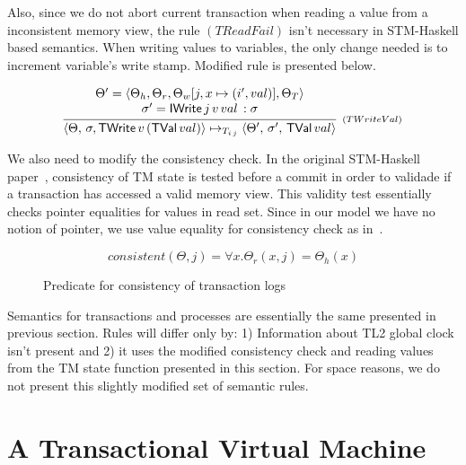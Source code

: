 \documentclass[sigplan, anonymous, review]{acmart}
\theoremstyle{definition}
\newcommand{\C}[1]{\red{\mathsf{#1}}}
\begin{document}
Also, since we do not abort current transaction when reading a value from a inconsistent
memory view, the rule $(TReadFail)$ isn't necessary in STM-Haskell based semantics. When writing
values to variables, the only change needed is to increment variable's write stamp.
Modified rule is presented below.

\[
  \begin{array}{l}
  \infer[_{(TWriteVal)}]
        { \langle \Theta, \, \sigma, \ensuremath{\C{TWrite}}\,v\,(\ensuremath{\C{TVal}}\,val)\rangle \mapsto_{T_{i\,j}}
          \langle \Theta', \, \sigma',\,\ensuremath{\C{TVal}}\,val\rangle}
        {\begin{array}{c}
            \Theta' = \langle \Theta_h, \Theta_r, \Theta_w[j,x \mapsto (i',val)], \Theta_T\rangle \\
            \sigma' = \ensuremath{\C{IWrite}}\,j\,v\,val\, : \sigma \\
         \end{array}}
  \end{array}
\]


We also need to modify the consistency check. In the original STM-Haskell paper~\cite{Harris05}, consistency
of TM state is tested before a commit in order to validade if a transaction has accessed a valid memory view.
This validity test essentially checks pointer equalities for values in read set. Since in our model we have no
notion of pointer, we use value equality for consistency check as in~\cite{Hu08}.
\begin{figure}[h]
  \[
     consistent(\Theta,j) = \forall x. \Theta_r(x,j) = \Theta_h(x)
  \]
  \centering
  \caption{Predicate for consistency of transaction logs}
  \label{fig:consistency1}
\end{figure}

Semantics for transactions and processes are essentially the same presented in previous section. Rules will
differ only by: 1) Information about TL2 global clock isn't present and 2) it uses the modified consistency
check and reading values from the TM state function presented in this section. For space reasons, we do not
present this slightly modified set of semantic rules.


\section{A Transactional Virtual Machine}\label{sec:stm-vm}

\end{document}
